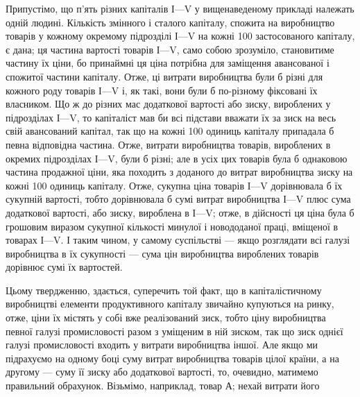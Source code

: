 Припустімо, що п’ять різних капіталів І—V у вищенаведеному прикладі належать одній людині. Кількість
змінного і сталого капіталу, спожита на виробництво товарів у кожному окремому підрозділі І—V на
кожні 100 застосованого капіталу,
є дана; ця частина вартості товарів І—V, само собою зрозуміло, становитиме частину їх ціни, бо
принаймні ця ціна потрібна для заміщення авансованої і спожитої частини капіталу. Отже, ці витрати
виробництва були б різні для кожного роду
товарів І—V і, як такі, вони були б по-різному фіксовані їх власником. Що ж до різних мас додаткової
вартості або зиску, вироблених у підрозділах І—V, то капіталіст мав би всі підстави вважати їх за
зиск на весь свій авансований капітал, так що
на кожні 100 одиниць капіталу припадала б певна відповідна
частина. Отже, витрати виробництва товарів, вироблених в окремих підрозділах І—V, були б різні; але
в усіх цих товарів
була б однаковою частина продажної ціни, яка походить з доданого до витрат виробництва зиску на
кожні 100 одиниць капіталу. Отже, сукупна ціна товарів І—V дорівнювала б їх сукупній вартості, тобто
дорівнювала б сумі витрат виробництва
І—V плюс сума додаткової вартості, або зиску, вироблена в
І—V; отже, в дійсності ця ціна була б грошовим виразом сукупної кількості минулої і новододаної
праці, вміщеної в товарах
І—V. І таким чином, у самому суспільстві — якщо розглядати
всі галузі виробництва в їх сукупності — сума цін виробництва
вироблених товарів дорівнює сумі їх вартостей.

Цьому твердженню, здається, суперечить той факт, що в
капіталістичному виробництві елементи продуктивного капіталу
звичайно купуються на ринку, отже, ціни їх містять у собі вже
реалізований зиск, тобто ціну виробництва певної галузі промисловості разом з уміщеним в ній зиском,
так що зиск однієї
галузі промисловості входить у витрати виробництва іншої.
Але якщо ми підрахуємо на одному боці суму витрат виробництва товарів цілої країни, а на другому —
суму її зиску або додаткової вартості, то, очевидно, матимемо правильний обрахунок. Візьмімо,
наприклад, товар А; нехай витрати його
\parbreak{}  %
